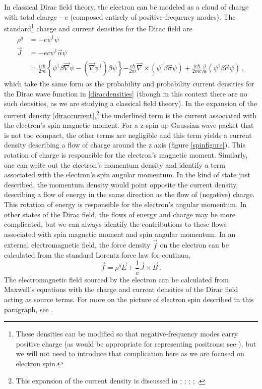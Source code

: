 \documentclass[onecolumn,secnumarabic,amsmath,amssymb,balancelastpage,nofootinbib]{article}
\begin{document}
In classical Dirac field theory, the electron can be modeled as a cloud of charge with total charge $-e$ (composed entirely of positive-frequency modes).  The standard\footnote{These densities can be modified so that negative-frequency modes carry positive charge (as would be appropriate for representing positrons; see \citealp{positrons}), but we will not need to introduce that complication here as we are focused on electron spin.} charge and current densities for the Dirac field are
\begin{align}
\rho^q&=-e \psi^{\dagger}\psi
\label{diraccharge}
\\
\vec{J}&=-ec \psi^{\dagger}\vec{\alpha}\psi
\nonumber
\\
&=\frac{i e\hbar}{2 m}\left\{\psi^\dagger \beta \vec{\nabla} \psi - (\vec{\nabla} \psi^\dagger) \beta\psi\right\}\underline{ - \frac{e\hbar}{2 m} \vec{\nabla}\times(\psi^\dagger \beta \vec{\sigma}\psi)}+\frac{i e\hbar}{2 m c}\frac{\partial}{\partial t}(\psi^\dagger \beta\vec{\alpha} \psi)
\ ,
\label{diraccurrent}
\end{align}
which take the same form as the probability and probability current densities for the Dirac wave function in \eqref{diracdensities} (though in this context there are no such densities, as we are studying a classical field theory).  In the expansion of the current density \eqref{diraccurrent},\footnote{This expansion of the current density is discussed in \citet{gordon1928}; \citet[pg.\ 321--322]{frenkel}; \citet[pg.\ 479]{huang1952}; \citet{ohanian}; \citet{howelectronsspin, smallelectronstates}.} the underlined term is the current associated with the electron's spin magnetic moment.  For a z-spin up Gaussian wave packet that is not too compact, the other terms are negligible and this term yields a current density describing a flow of charge around the z axis (figure \ref{spinfigure}).  This rotation of charge is responsible for the electron's magnetic moment.  Similarly, one can write out the electron's momentum density and identify a term associated with the electron's spin angular momentum.  In the kind of state just described, the momentum density would point opposite the current density, describing a flow of energy in the same direction as the flow of (negative) charge.  This rotation of energy is responsible for the electron's angular momentum.  In other states of the Dirac field, the flows of energy and charge may be more complicated, but we can always identify the contributions to these flows associated with spin magnetic moment and spin angular momentum.  In an external electromagnetic field, the force density $\vec{f}$ on the electron can be calculated from the standard Lorentz force law for continua,
\begin{equation}
\vec{f}=\rho^q\vec{E}+\frac{1}{c}\vec{J}\times\vec{B}
\ .
\label{forcelaw}
\end{equation}
The electromagnetic field sourced by the electron can be calculated from Maxwell's equations with the charge and current densities of the Dirac field acting as source terms.  For more on the picture of electron spin described in this paragraph, see \citet{ohanian, chuu2010, howelectronsspin, smallelectronstates, spinmeasurement}.
\end{document}
